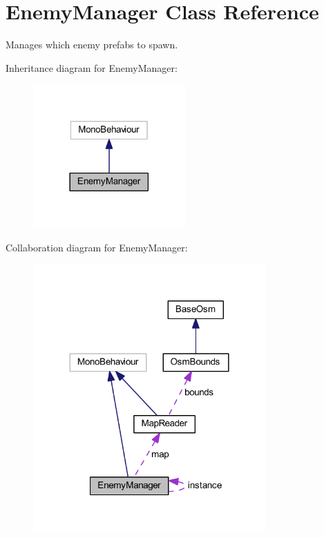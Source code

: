 \hypertarget{class_enemy_manager}{}\section{Enemy\+Manager Class Reference}
\label{class_enemy_manager}


Manages which enemy prefabs to spawn.  




Inheritance diagram for Enemy\+Manager\+:\nopagebreak
\begin{figure}[H]
\begin{center}
\leavevmode
\includegraphics[width=165pt]{class_enemy_manager__inherit__graph}
\end{center}
\end{figure}


Collaboration diagram for Enemy\+Manager\+:\nopagebreak
\begin{figure}[H]
\begin{center}
\leavevmode
\includegraphics[width=252pt]{class_enemy_manager__coll__graph}
\end{center}
\end{figure}
